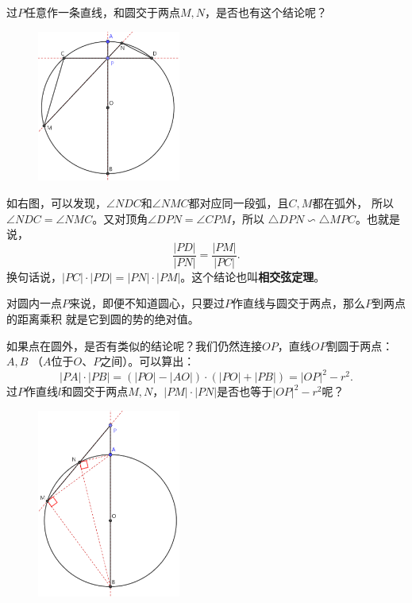 \documentclass[12pt,UTF8]{ctexbook}
\begin{document}
过$P$任意作一条直线，和圆交于两点$M,N$，是否也有这个结论呢？

\begin{figure} %
    \vspace{-22pt}
    \flushright
    \includegraphics[width=0.42\textwidth]{tu/圆势1.png}
\end{figure}

如右图，可以发现，$\angle NDC$和$\angle NMC$都对应同一段弧，且$C,M$都在弧外，
所以$\angle NDC = \angle NMC$。又对顶角$\angle DPN = \angle CPM$，所以
$ \triangle DPN \backsim \triangle MPC$。也就是说，
$$ \frac{|PD|}{|PN|} = \frac{|PM|}{|PC|}.$$
换句话说，$|PC| \cdot |PD| = |PN|\cdot|PM|$。这个结论也叫\textbf{相交弦定理}。

对圆内一点$P$来说，即便不知道圆心，只要过$P$作直线与圆交于两点，那么$P$到两点的距离乘积
就是它到圆的势的绝对值。

如果点在圆外，是否有类似的结论呢？我们仍然连接$OP$，直线$OP$割圆于两点：$A,B$
（$A$位于$O$、$P$之间）。可以算出：
$$|PA|\cdot|PB| = (|PO| - |AO|) \cdot (|PO| + |PB|) = |OP|^2 - r^2.$$
过$P$作直线$l$和圆交于两点$M,N$，$|PM| \cdot |PN|$是否也等于$|OP|^2 - r^2$呢？

\begin{figure} %
    \vspace{-18pt}
    \flushright
    \includegraphics[width=0.42\textwidth]{tu/圆势2.png}
\end{figure}
\end{document}

